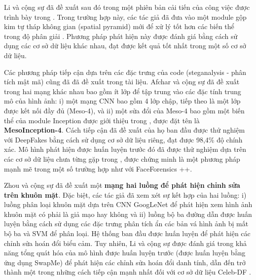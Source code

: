 \documentclass{article}
\begin{document}
Li và cộng sự đã đề xuất sau đó trong  một phiên bản cải tiến của công việc được trình bày trong . Trong trường hợp này, các tác giả đã đưa vào một module gộp kim tự tháp không gian (spatial pyramid) mới để xử lý tốt hơn các biến thể trong độ phân giải . Phương pháp phát hiện này được đánh giá bằng cách sử dụng các cơ sở dữ liệu khác nhau, đạt được kết quả tốt nhất trong một số cơ sở dữ liệu.

Các phương pháp tiếp cận dựa trên các đặc trưng của code (steganalysis - phân tích mật mã) cũng đã đã đề xuất trong tài liệu. Afchar và cộng sự đã đề xuất trong  hai mạng khác nhau bao gồm ít lớp để tập trung vào các đặc tính trung mô của hình ảnh: i) một mạng CNN bao gồm 4 lớp chập, tiếp theo là một lớp được kết nối đầy đủ (Meso-4), và ii) một sửa đổi của Meso-4 bao gồm một biến thể của module Inception được giới thiệu trong , được đặt tên là \textbf{MesoInception-4}. Cách tiếp cận đã đề xuất của họ ban đầu được thử nghiệm với DeepFakes bằng cách sử dụng cơ sở dữ liệu riêng, đạt được 98,4\% độ chính xác. Mô hình phát hiện được huấn luyện trước đó đã được thử nghiệm dựa trên các cơ sở dữ liệu chưa từng gặp trong , được chứng minh là một phương pháp mạnh mẽ trong một số trường hợp như với FaceForensics ++.

Zhou và cộng sự đã đề xuất một \textbf{mạng hai luồng để phát hiện chỉnh sửa trên khuôn mặt}. Đặc biệt, các tác giả đã xem xét sự kết hợp của hai luồng: i) luồng phân loại khuôn mặt dựa trên CNN GoogLeNet  để phát hiện xem hình ảnh khuôn mặt có phải là giả mạo hay không và ii) luồng bộ ba đường dẫn được huấn luyện bằng cách sử dụng các đặc trưng phân tích ẩn các bản vá hình ảnh bị mất bộ ba và SVM để phân loại. Hệ thống ban đầu được huấn luyện để phát hiện các chỉnh sửa hoán đổi biểu cảm. Tuy nhiên, Li và cộng sự được đánh giá trong  khả năng tổng quát hóa của mô hình được huấn luyện trước (được huấn luyện bằng ứng dụng SwapMe) để phát hiện các chỉnh sửa hoán đổi danh tính, dẫn đến trở thành một trong những cách tiếp cận mạnh nhất đối với cơ sở dữ liệu Celeb-DF .
\end{document}
